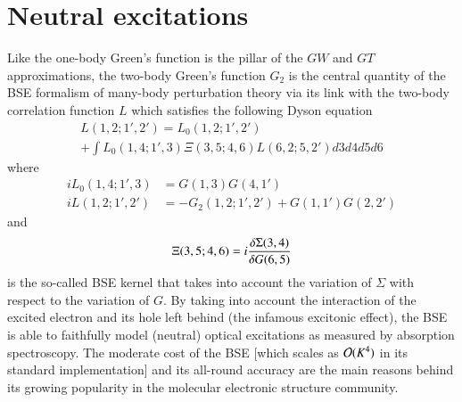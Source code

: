 \documentclass[aip,jcp,reprint,noshowkeys,superscriptaddress]{revtex4-1}
\begin{document}
\section{Neutral excitations}
\label{sec:neutral}
Like the one-body Green's function is the pillar of the $GW$ and $GT$ approximations, the two-body Green's function $G_2$ is the central quantity of the BSE formalism of many-body perturbation theory \cite{Salpeter_1951,Strinati_1988,Blase_2018,Blase_2020} via its link with the two-body correlation function $L$ which satisfies the following Dyson equation 
\begin{multline}
	 L(1,2;1',2') = L_0(1,2;1',2') 
	 \\
	 + \int L_0(1,4;1',3) \Xi(3,5;4,6) L(6,2;5,2') d3d4d5d6
\end{multline}
where
\begin{subequations}
\begin{align}
\label{eq:L0}
	 iL_0(1,4;1',3) & = G(1,3) G(4,1')
	 \\
\label{eq:L}
	 iL(1,2;1',2') & = -G_2(1,2;1',2') + G(1,1')G(2,2')
\end{align}
\end{subequations}
and 
\begin{equation}
\label{eq:Xi}
	\Xi(3,5;4,6) = i \fdv{\Sigma(3,4)}{G(6,5)}
\end{equation}
is the so-called BSE kernel that takes into account the variation of $\Sigma$ with respect to the variation of $G$.
By taking into account the interaction of the excited electron and its hole left behind (the infamous excitonic effect), the BSE is able to faithfully model (neutral) optical excitations as measured by absorption spectroscopy. 
The moderate cost of the BSE [which scales as $\order*{K^4}$ in its standard implementation] and its all-round accuracy are the main reasons behind its growing popularity in the molecular electronic structure community. \cite{Rohlfing_1999a,Horst_1999,Puschnig_2002,Tiago_2003,Boulanger_2014,Jacquemin_2015a,Bruneval_2015,Jacquemin_2015b,Hirose_2015,Jacquemin_2017a,Jacquemin_2017b,Rangel_2017,Krause_2017,Gui_2018,Blase_2018,Liu_2020,Blase_2020,Holzer_2018a,Holzer_2018b,Loos_2020e,Loos_2021}
\end{document}
